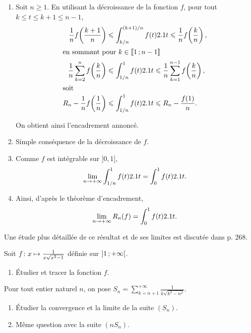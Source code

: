 \begin{elemsolution}
\begin{enumerate}
\item Soit $n \geqslant 1$. En utilisant la décroissance de la fonction $f$, pour tout $k \leqslant t \leqslant k + 1 \leqslant n-1$,
\begin{align*}
\frac{1}{n} f\mathopen{}\left(\frac{k+1}{n}\right) &\leqslant \int_{k/n}^{(k+1)/n} f(t) \d t \leqslant \frac{1}{n} f\mathopen{}\left(\frac{k}{n}\right),\\
\intertext{en sommant pour $k \in \interent{1}{n-1}$}
\frac{1}{n} \sum\limits_{k=2}^{n} f\mathopen{}\left(\frac{k}{n}\right) &\leqslant \displaystyle\int_{1/n}^1 f(t) \d t \leqslant \frac{1}{n} \sum\limits_{k=1}^{n-1} f\mathopen{}\left(\frac{k}{n}\right),\\
\intertext{soit}
R_n - \frac{1}{n} f\mathopen{}\left(\frac{1}{n}\right) &\leqslant \displaystyle\int_{1/n}^1 f(t) \d t \leqslant R_n - \frac{f(1)}{n}.
\end{align*}

On obtient ainsi l'encadrement annoncé.

\item Simple conséquence de la décroissance de $f$.

\item Comme $f$ est intégrable sur $]0, 1]$,
\[
\lim\limits_{n\to+\infty} \displaystyle\int_{1/n}^1 f(t) \d t = \displaystyle\int_0^1 f(t) \d t.
\]

\item Ainsi, d'après le théorème d'encadrement,
\[
\lim\limits_{n\to+\infty} R_n(f) = \displaystyle\int_0^1 f(t) \d t.
\]
\end{enumerate}
\end{elemsolution}

\begin{remarque}
Une étude plus détaillée de ce résultat et de ses limites est discutée dans \cite{truc2019} p. 268.
\end{remarque}


\begin{exercice}
Soit $\fonctionligne[f]{x}{\frac{1}{x \sqrt{x^2 - 1}}}$ définie sur $\interoo{1}{+\infty}$.
\begin{enumerate}
\item Étudier et tracer la fonction $f$.
\end{enumerate}
Pour tout entier naturel $n$, on pose $S_n = \sum\limits_{k=n+1}^{+\infty} \frac{1}{k \sqrt{k^2 - n^2}}$.
\begin{enumerate}[resume]
\item Étudier la convergence et la limite de la suite $(S_n)$.

\item Même question avec la suite $(n S_n)$.
\end{enumerate}
\end{exercice}

